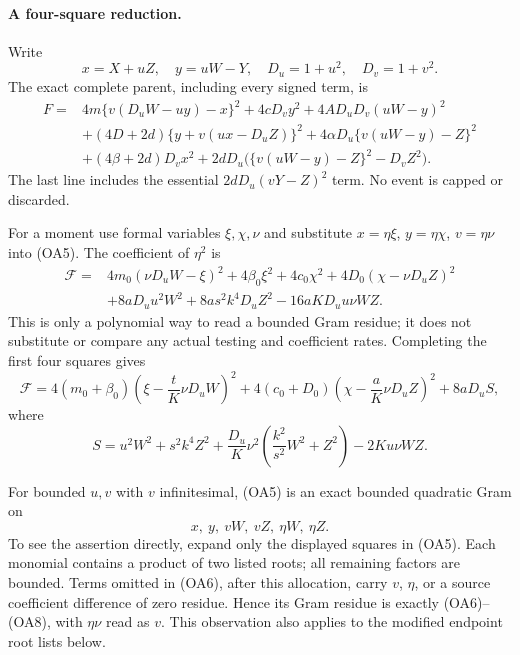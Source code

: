 \paragraph{A four-square reduction.}
Write
\[
 x=X+uZ,\quad y=uW-Y,\quad D_u=1+u^2,\quad D_v=1+v^2.
\]
The exact complete parent, including every signed term, is
\begin{align*}
 F={}&4m\{v(D_uW-uy)-x\}^2+4cD_vy^2
       +4AD_uD_v(uW-y)^2\\
 &+(4D+2d)\{y+v(ux-D_uZ)\}^2
       +4\alpha D_u\{v(uW-y)-Z\}^2\\
 &+(4\beta+2d)D_vx^2
       +2dD_u\bigl(\{v(uW-y)-Z\}^2-D_vZ^2\bigr).
                                                        \tag{OA5}
\end{align*}
The last line includes the essential $2dD_u(vY-Z)^2$ term.
No event is capped or discarded.

For a moment use formal variables $\xi,\chi,\nu$ and substitute
$x=\eta\xi$, $y=\eta\chi$, $v=\eta\nu$ into (OA5).
The coefficient of $\eta^2$ is
\begin{align*}
 \mathcal F={}&4m_0(\nu D_uW-\xi)^2+4\beta_0\xi^2
       +4c_0\chi^2+4D_0(\chi-\nu D_uZ)^2\\
 &+8aD_uu^2W^2+8as^2k^4D_uZ^2
       -16aKD_uu\nu WZ.
                                                        \tag{OA6}
\end{align*}
This is only a polynomial way to read a bounded Gram residue; it does
not substitute or compare any actual testing and coefficient rates.
Completing the first four squares gives
\[
 \mathcal F=4(m_0+\beta_0)
  \left(\xi-\frac tK\nu D_uW\right)^2
 +4(c_0+D_0)\left(\chi-\frac aK\nu D_uZ\right)^2
 +8aD_uS,                                               \tag{OA7}
\]
where
\[
 S=u^2W^2+s^2k^4Z^2+
   \frac{D_u}{K}\nu^2\left(\frac{k^2}{s^2}W^2+Z^2\right)
   -2Ku\nu WZ.                                         \tag{OA8}
\]

For bounded $u,v$ with $v$ infinitesimal, (OA5) is an exact bounded
quadratic Gram on
\[
                 x,\ y,\ vW,\ vZ,\ \eta W,\ \eta Z.    \tag{OA9}
\]
To see the assertion directly, expand only the displayed squares in
(OA5). Each monomial contains a product of two listed roots; all
remaining factors are bounded. Terms omitted in (OA6), after this
allocation, carry $v$, $\eta$, or a source coefficient difference of
zero residue. Hence its Gram residue is exactly (OA6)--(OA8), with
$\eta\nu$ read as $v$. This observation also applies to the modified
endpoint root lists below.

